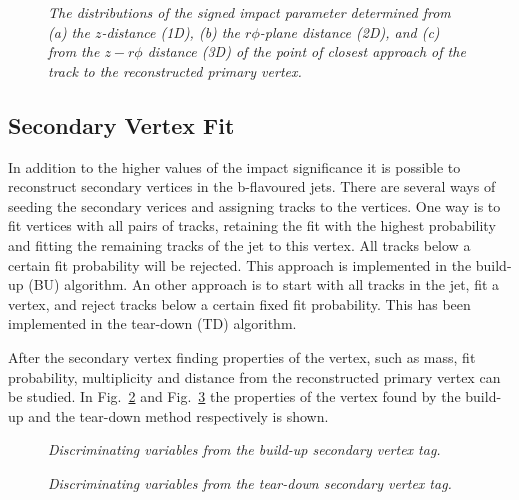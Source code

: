 \documentclass[a4paper,12pt]{article}
\begin{document}
\begin{figure}[htbp]
  \centerline
  {
  }
  \caption[]{\label{fig:recvertex}\sl The distributions of the signed
    impact parameter determined from (a) the $z$-distance (1D), (b)
    the $r\phi$-plane distance (2D), and (c) from the $z-r\phi$
    distance (3D) of the point of closest approach of the track to the
    reconstructed primary vertex.}
\end{figure}

\subsection{Secondary Vertex Fit}
In addition to the higher values of the impact significance it is
possible to reconstruct secondary vertices in the b-flavoured jets.
There are several ways of seeding the secondary verices and assigning
tracks to the vertices. One way is to fit vertices with all pairs of
tracks, retaining the fit with the highest probability and fitting the
remaining tracks of the jet to this vertex. All tracks below a certain
fit probability will be rejected. This approach is implemented in the
build-up (BU) algorithm. An other approach is to start with all tracks
in the jet, fit a vertex, and reject tracks below a certain fixed fit
probability. This has been implemented in the tear-down (TD)
algorithm.  

After the secondary vertex finding properties of the vertex, such as
mass, fit probability, multiplicity and distance from the
reconstructed primary vertex can be studied. In Fig.~\ref{fig:BUvars}
and Fig.~\ref{fig:TDvars} the properties of the vertex found by the
build-up and the tear-down method respectively is shown.

\begin{figure}[htbp]
  \centerline
  {
  }  
  \centerline
  {
  }
  \caption[]{\label{fig:BUvars}\sl
    Discriminating variables from the build-up secondary vertex tag.  }
\end{figure}

\begin{figure}[htbp]
  \centerline
  {
  }  
  \centerline
  {
  }
  \caption[]{\label{fig:TDvars}\sl
    Discriminating variables from the tear-down secondary vertex tag.  }
\end{figure}
\end{document}
